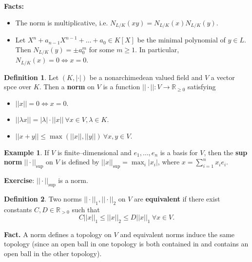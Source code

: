 \documentclass{article}
\theoremstyle{definition}
\newtheorem{example}{Example}[section]
\newtheorem{defn}{Definition}[section]
\begin{document}
\textbf{Facts:} 
\begin{itemize}
    \item The norm is multiplicative, i.e. $N_{L/K}(xy) = N_{L/K}(x)N_{L/K}(y)$.
    \item Let $X^n + a_{n-1}X^{n-1}+\ldots+a_0 \in K[X]$ be the minimal polynomial of $y \in L$. Then $N_{L/K}(y) = \pm a_0^m$ for some $m\ge 1$. In particular, $N_{L/K}(x)=0 \iff x = 0$.
\end{itemize} 
\begin{defn}
    Let $(K,|\cdot|)$ be a nonarchimedean valued field and $V$ a vector spce over $K$. Then a \textbf{norm} on $V$ is a function $||\cdot || : V \to \mathbb{R}_{\ge 0}$ satisfying
    \begin{itemize}
        \item $||x|| = 0 \iff x = 0$.
        \item $||\lambda x|| = |\lambda| \cdot ||x|| ~\forall x \in V, \lambda \in K$.
        \item $||x+y|| \le \max(||x||,||y||) ~\forall x,y \in V$. 
    \end{itemize}
\end{defn}
\begin{example}
    If $V$ is finite--dimensional and $e_1,\ldots,e_n$ is a basis for $V$, then the \textbf{sup norm} $||\cdot ||_{\text{sup}}$ on $V$ is defined by $||x||_{\text{sup}} = \max_i |x_i|$, where $x = \sum_{i=1}^{n} x_ie_i$.
\end{example}
\textbf{Exercise}: $||\cdot ||_{\text{sup}}$ is a norm.
\begin{defn}
    Two norms $||\cdot ||_1, ||\cdot ||_2$ on $V$ are \textbf{equivalent} if there exist constants $C, D \in \mathbb{R}_{>0}$ such that \[
    C ||x||_1 \le ||x||_2 \le D ||x||_1 ~\forall x \in V.
    \]
\end{defn}
\textbf{Fact.} A norm defines a topology on $V$ and equivalent norms induce the same topology (since an open ball in one topology is both contained in and contains an open ball in the other topology).
\end{document}
